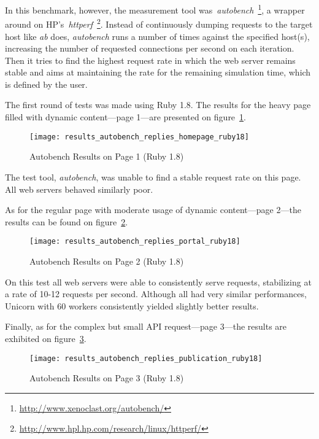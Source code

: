 In this benchmark, however, the measurement tool was~\textit{autobench}~\footnote{\url{http://www.xenoclast.org/autobench/}}, a wrapper around on HP's~\textit{httperf}~\footnote{\url{http://www.hpl.hp.com/research/linux/httperf/}}. Instead of continuously dumping requests to the target host like \textit{ab} does, \textit{autobench} runs a number of times against the specified host(s), increasing the number of requested connections per second on each iteration. Then it tries to find the highest request rate in which the web server remains stable and aims at maintaining the rate for the remaining simulation time, which is defined by the user.

The first round of tests was made using Ruby 1.8. The results for the heavy page filled with dynamic content---page 1---are presented on figure~\ref{fig:page1_autobench_ruby18_results}.
\begin{figure}[h!]
  \centering
    \caption{Autobench Results on Page 1 (Ruby 1.8)}
    \texttt{[image: results\_autobench\_replies\_homepage\_ruby18]}
  \label{fig:page1_autobench_ruby18_results}
\end{figure}

The test tool, \textit{autobench}, was unable to find a stable request rate on this page. All web servers behaved similarly poor. 

As for the regular page with moderate usage of dynamic content---page 2---the results can be found on figure~\ref{fig:page2_autobench_ruby18_results}.
\begin{figure}[h!]
  \centering
    \caption{Autobench Results on Page 2 (Ruby 1.8)}
    \texttt{[image: results\_autobench\_replies\_portal\_ruby18]}
  \label{fig:page2_autobench_ruby18_results}
\end{figure}

On this test all web servers were able to consistently serve requests, stabilizing at a rate of 10-12 requests per second. Although all had very similar performances, Unicorn with 60 workers consistently yielded slightly better results.

Finally, as for the complex but small API request---page 3---the results are exhibited on figure~\ref{fig:page3_autobench_ruby18_results}.
\begin{figure}[h!]
  \centering
    \caption{Autobench Results on Page 3 (Ruby 1.8)}
    \texttt{[image: results\_autobench\_replies\_publication\_ruby18]}
  \label{fig:page3_autobench_ruby18_results}
\end{figure}

